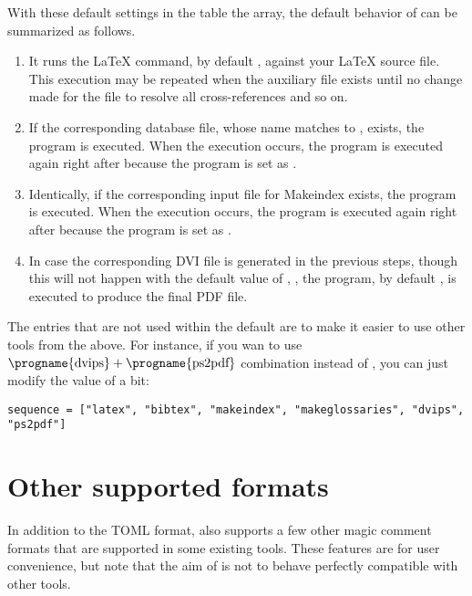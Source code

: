 \documentclass{llmk-doc}
\begin{document}
With these default settings in the  table the 
array, the default behavior of  can be summarized as follows.
%
\begin{enumerate}
\item It runs the {\LaTeX} command, by default {\LuaLaTeX}, against your
  {\LaTeX} source file. This execution may be repeated when the auxiliary file
  exists until no change made for the file to resolve all cross-references and
  so on.
\item If the corresponding {\BibTeX} database file, whose name matches to
  , exists, the {\BibTeX} program is executed. When the execution
  occurs, the  program is executed again right after because
  the program is set as .
\item Identically, if the corresponding input file for Makeindex exists, the
  program is executed. When the execution occurs, the  program
  is executed again right after because the program is set as .
\item In case the corresponding DVI file is generated in the previous steps,
  though this will not happen with the default value of , \ie
  , the  program, by default ,
  is executed to produce the final PDF file.
\end{enumerate}

The entries that are not used within the default  are to make it
easier to use other tools from the above. For instance, if you wan to use
$\text{\progname{dvips}}+\text{\progname{ps2pdf}}$ combination instead of
, you can just modify the value of  a bit:
%
\begin{lstlisting}[style=toml]
sequence = ["latex", "bibtex", "makeindex", "makeglossaries", "dvips", "ps2pdf"]
\end{lstlisting}

\section{Other supported formats}
\label{sec:magic-comment}

In addition to the TOML format,  also supports a few other magic
comment formats that are supported in some existing tools. These features are
for user convenience, but note that the aim of  is not to behave
perfectly compatible with other tools.
\end{document}
